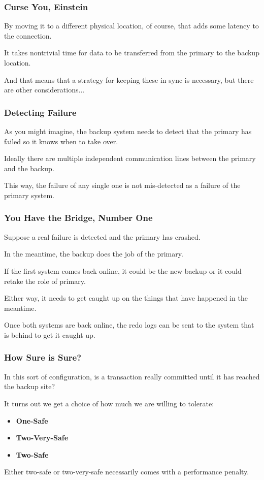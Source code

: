 \begin{frame}
\frametitle{Curse You, Einstein}

By moving it to a different physical location, of course, that adds some latency to the connection. 

It takes nontrivial time for data to be transferred from the primary to the backup location. 

And that means that a strategy for keeping these in sync is necessary, but there are other considerations...

\end{frame}


\begin{frame}
\frametitle{Detecting Failure}

 As you might imagine, the backup system needs to detect that the primary has failed so it knows when to take over. 
 
 Ideally there are multiple independent communication lines between the primary and the backup.
 
This way, the failure of any single one is not mis-detected as a failure of the primary system.

\end{frame}


\begin{frame}
\frametitle{You Have the Bridge, Number One}

Suppose a real failure is detected and the primary has crashed. 

In the meantime, the backup does the job of the primary. 

If the first system comes back online, it could be the new backup or it could retake the role of primary. 

Either way, it needs to get caught up on the things that have happened in the meantime. 

Once both systems are back online, the redo logs can be sent to the system that is behind to get it caught up.

\end{frame}

\begin{frame}
\frametitle{How Sure is Sure?}

In this sort of configuration, is a transaction really committed until it has reached the backup site? 

It turns out we get a choice of how much we are willing to tolerate:

\begin{itemize}
	\item \textbf{One-Safe}
	\item \textbf{Two-Very-Safe}
	\item \textbf{Two-Safe}
\end{itemize}


Either two-safe or two-very-safe necessarily comes with a performance penalty.

\end{frame}


